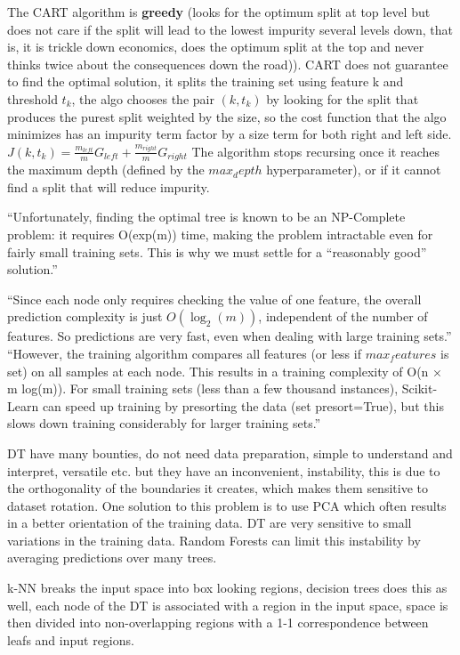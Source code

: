 \documentclass[11pt]{article}
\begin{document}
The CART algorithm is \textbf{greedy} (looks for the optimum split at top level but does not care if the split will lead to the lowest impurity several levels down, that is, it is trickle down economics, does the optimum split at the top and never thinks twice about the consequences down the road)). CART does not guarantee to find the optimal solution, it splits the training set using feature k and threshold $t_k$, the algo chooses the pair $(k,t_k)$ by looking for the split that produces the purest split weighted by the size, so the cost function that the algo minimizes has an impurity term factor by a size term for both right and left side.
$J(k,t_k) = \frac{m_{left}}{m}G_{left} + \frac{m_{right}}{m}G_{right}$
The algorithm stops recursing once it reaches the maximum depth (defined by the $max_depth$ hyperparameter), or if it cannot find a split that will reduce impurity.

“Unfortunately, finding the optimal tree is known to be an NP-Complete problem: it requires O(exp(m)) time, making the problem intractable even for fairly small training sets. This is why we must settle for a “reasonably good” solution.”

“Since each node only requires checking the value of one feature, the overall prediction complexity is just $O(\log_{2}(m))$, independent of the number of features. So predictions are very fast, even when dealing with large training sets.”
“However, the training algorithm compares all features (or less if $max_features$ is set) on all samples at each node. This results in a training complexity of O(n × m log(m)). For small training sets (less than a few thousand instances), Scikit-Learn can speed up training by presorting the data (set presort=True), but this slows down training considerably for larger training sets.”
 

DT have many bounties, do not need data preparation, simple to understand and interpret, versatile etc. but they have an inconvenient, instability, this is due to the orthogonality of the boundaries it creates, which makes them sensitive to dataset rotation.  One solution to this problem is to use PCA which often results in a better orientation of the training data. DT are very sensitive to small variations in the training data. Random Forests can limit this instability by averaging predictions over many trees.

k-NN breaks the input space into box looking regions, decision trees does this as well, each node of the DT is associated with a region in the input space, space is then divided into non-overlapping regions with a 1-1 correspondence between leafs and input regions.
\end{document}
